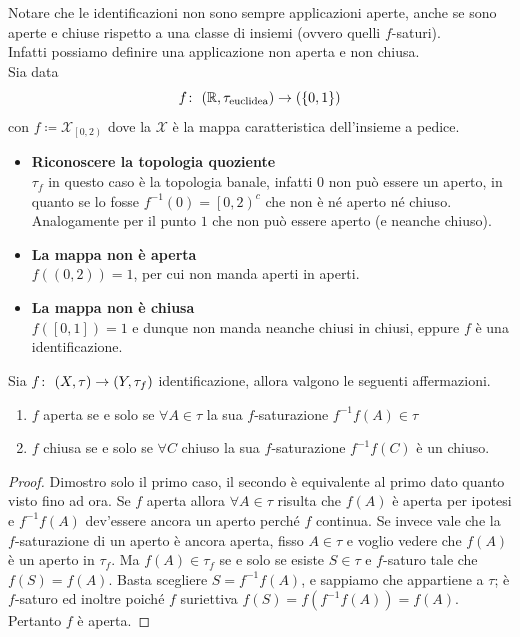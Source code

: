 \begin{remark}
	Notare che le identificazioni non sono sempre applicazioni aperte, anche se sono aperte e chiuse rispetto a una classe di insiemi (ovvero quelli $f$-saturi). \\ Infatti possiamo definire una applicazione non aperta e non chiusa.\\ Sia data 
	\begin{equation*}
	f \colon\ (\mathbb{R}, \tau_{\text{euclidea}}) \rightarrow (\left\{0,1\right\})
	\end{equation*}
	con $f \coloneqq \mathcal{X}_{\left[0,2\right)}$ dove la $\mathcal{X}$ è la mappa caratteristica dell'insieme a pedice. 
	\begin{itemize}
		\item \textbf{Riconoscere la topologia quoziente} \\ $\tau_f$ in questo caso è la topologia banale, infatti $0$ non può essere un aperto, in quanto se lo fosse $f^{-1}(0) = \left[0, 2\right)^c$ che non  è né aperto né chiuso. Analogamente per il punto $1$ che non può essere aperto (e neanche chiuso). 
		\item \textbf{La mappa non è aperta} \\ $f((0,2)) = 1$, per cui non manda aperti in aperti.
		\item \textbf{La mappa non è chiusa} \\ $f(\left[0,1\right]) = 1$ e dunque non manda neanche chiusi in chiusi, eppure $f$ è una identificazione.
	\end{itemize}
\end{remark}

\begin{theorem}
	Sia $f \colon\ (X,\tau) \rightarrow (Y, \tau_f)$ identificazione, allora valgono le seguenti affermazioni.
	\begin{enumerate}
		\item $f$ aperta se e solo se $\forall A \in \tau$ la sua $f$-saturazione $f^{-1}f(A) \in \tau$
		\item $f$ chiusa se e solo se $\forall C$ chiuso la sua $f$-saturazione $f^{-1}f(C)$ è un chiuso.
	\end{enumerate}
\end{theorem}
\begin{proof}
	Dimostro solo il primo caso, il secondo è equivalente al primo dato quanto visto fino ad ora. Se $f$ aperta allora $\forall A \in \tau$ risulta che $f(A)$ è aperta per ipotesi e $f^{-1}f(A)$ dev'essere ancora un aperto perché $f$ continua. Se invece vale che la $f$-saturazione di un aperto è ancora aperta, fisso $A \in \tau$ e voglio vedere che $f(A)$ è un aperto in $\tau_f$. Ma $f(A) \in \tau_f$ se e solo se esiste $S \in \tau$ e $f$-saturo tale che $f(S) = f(A)$. Basta scegliere $S = f^{-1}f(A)$, e sappiamo che appartiene a $\tau$; è $f$-saturo ed inoltre poiché $f$ suriettiva $f(S) = f(f^{-1}f(A)) = f(A)$. Pertanto $f$ è aperta. 
\end{proof}

